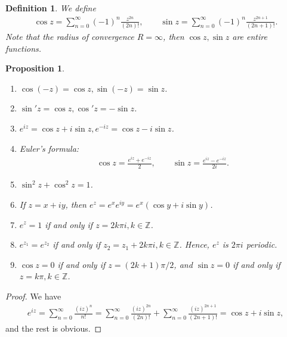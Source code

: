 \documentclass[11pt]{book}
\newtheorem{definition}{Definition}[chapter]
\newtheorem{proposition}{Proposition}[chapter]
\theoremstyle{definition}
\numberwithin{equation}{chapter}
\begin{document}
\medskip

\begin{definition}
We define
\begin{align*}
    \cos z = \sum^\infty_{n=0} (-1)^n \frac{z^{2n}}{(2n)!}, \qquad \sin z = \sum^\infty_{n=0} (-1)^n \frac{z^{2n+1}}{(2n+1)!}.
\end{align*}
Note that the radius of convergence $R = \infty$, then $\cos z, \sin z$ are entire functions.
\end{definition}

\medskip

\begin{proposition}
~\begin{enumerate}[label=(\alph*)]
    \item $\cos (-z) = \cos z, \sin (-z) = \sin z$.
    
    \item $\sin' z = \cos z, \cos'z = - \sin z$.
    
    \item $e^{iz} = \cos z + i \sin z, e^{-iz} = \cos z - i \sin z$.
    
    \item Euler's formula:
    \begin{align*}
        \cos z = \frac{e^{iz} + e^{-iz}}{2}, \qquad \sin z = \frac{e^{iz} - e^{-iz}}{2i}.
    \end{align*}
    
    \item $\sin^2 z + \cos ^2 z = 1$. 
    
    \item If $z = x + iy$, then $e^z = e^x e^{iy} = e^x \left(\cos y + i \sin y\right)$.
    
    \item $e^z = 1$ if and only if $z = 2k\pi i, k \in \mathbb{Z}$. 
    
    \item $e^{z_1} = e^{z_2}$ if and only if $z_2 = z_1 + 2k\pi i, k \in \mathbb{Z}$. Hence, $e^z$ is $2\pi i$ periodic.
    
    \item $\cos z = 0$ if and only if $z = (2k+1)\pi/2$, and $\sin z = 0$ if and only if $z = k\pi, k \in \mathbb{Z}$.
\end{enumerate}
\end{proposition}
\begin{proof}
We have
\begin{align*}
    e^{iz} = \sum^\infty_{n=0} \frac{(iz)^n}{n!} = \sum^\infty_{n=0} \frac{(iz)^{2n}}{(2n)!} + \sum^\infty_{n=0} \frac{(iz)^{2n+1}}{(2n+1)!} = \cos z + i \sin z,
\end{align*}
and the rest is obvious.
\end{proof}
\end{document}
